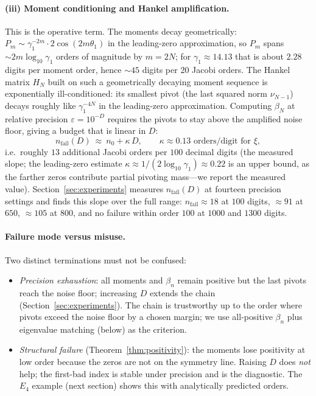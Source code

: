 \documentclass[11pt]{article}
\theoremstyle{definition}
\begin{document}
\paragraph{(iii) Moment conditioning and Hankel amplification.}
This is the operative term. The moments decay geometrically:
$P_m\sim\gamma_1^{-2m}\cdot 2\cos(2m\theta_1)$ in the leading-zero
approximation, so $P_m$ spans $\sim 2m\log_{10}\gamma_1$ orders of
magnitude by $m=2N$; for $\gamma_1\approx14.13$ that is about
$2.28$ digits per moment order, hence $\sim 45$ digits per 20 Jacobi
orders. The Hankel matrix $H_N$ built on such a geometrically
decaying moment sequence is exponentially ill-conditioned: its
smallest pivot (the last squared norm $\nu_{N-1}$) decays roughly
like $\gamma_1^{-4N}$ in the leading-zero approximation. Computing
$\beta_N$ at relative precision $\varepsilon=10^{-D}$ requires the
pivots to stay above the amplified noise floor, giving a budget that
is linear in $D$:
\begin{equation}\label{eq:budget}
n_{\text{fail}}(D)\ \approx\ n_0+\kappa\,D,
\qquad \kappa\approx 0.13\text{ orders/digit for }\xi,
\end{equation}
i.e.\ roughly $13$ additional Jacobi orders per $100$ decimal digits
(the measured slope; the leading-zero estimate $\kappa\approx
1/(2\log_{10}\gamma_1)\approx 0.22$ is an upper bound, as the
farther zeros contribute partial pivoting mass---we report the
measured value). Section~\ref{sec:experiments} measures
$n_{\text{fail}}(D)$ at fourteen precision settings and finds this
slope over the full range: $n_{\text{fail}}\approx 18$ at $100$
digits, $\approx 91$ at $650$, $\approx 105$ at $800$, and no
failure within order $100$ at $1000$ and $1300$ digits.

\paragraph{Failure mode versus misuse.}
Two distinct terminations must not be confused:
\begin{itemize}
\item \emph{Precision exhaustion}: all moments and $\beta_n$ remain
positive but the last pivots reach the noise floor; increasing $D$
extends the chain (Section~\ref{sec:experiments}). The chain is
trustworthy up to the order where pivots exceed the noise floor by a
chosen margin; we use all-positive $\beta_n$ plus eigenvalue
matching (below) as the criterion.
\item \emph{Structural failure} (Theorem~\ref{thm:positivity}): the
moments lose positivity at low order because the zeros are not on
the symmetry line. Raising $D$ does \emph{not} help; the first-bad
index is stable under precision and is the diagnostic. The $E_4$
example (next section) shows this with analytically predicted
orders.
\end{itemize}
\end{document}
